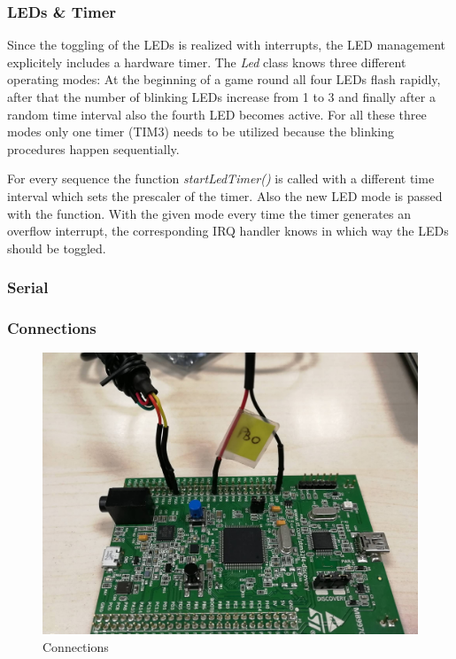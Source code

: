 \subsubsection{LEDs \& Timer}
Since the toggling of the LEDs is realized with interrupts, the LED management explicitely includes a hardware timer. The \emph{Led} class knows three different operating modes: At the beginning of a game round all four LEDs flash rapidly, after that the number of blinking LEDs increase from 1 to 3 and finally after a random time interval also the fourth LED becomes active. For all these three modes only one timer (TIM3) needs to be utilized because the blinking procedures happen sequentially.\\
\par
For every sequence the function \emph{startLedTimer()} is called with a different time interval which sets the prescaler of the timer. Also the new LED mode is passed with the function. With the given mode every time the timer generates an overflow interrupt, the corresponding IRQ handler knows in which way the LEDs should be toggled.

\subsubsection{Serial}

\subsubsection{Connections}

\cite{RefManual}
\begin{figure}[htbp]
  \centering
     \includegraphics[width=1\textwidth]{./figures/connections.jpg}
  \caption{Connections}
  \label{fig:connections}
\end{figure}

